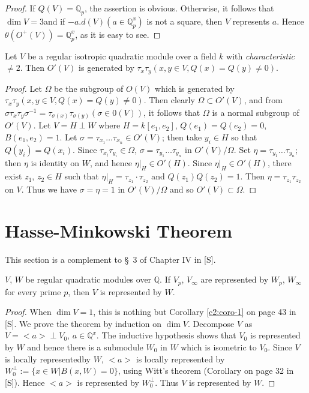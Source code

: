 \begin{proof}
If $Q(V)=\mathbb{Q}_{p}$, the assertion is obvious. Otherwise, it
follows that $\dim V=3$\pageoriginale and if
$-a.d(V)(a\in\mathbb{Q}^{x}_{p})$ is not a square, then $V$ represents
$a$. Hence $\theta(O^{+}(V))=\mathbb{Q}^{x}_{p}$, as it is easy to see.
\end{proof}

\begin{prop}\label{c2:prop-2.21}
Let $V$ be a regular isotropic quadratic module over a field $k$ with
{\em characteristic} $\neq 2$. Then $O'(V)$ is generated by
$\tau_{x}\tau_{y}(x,y\in V, Q(x)=Q(y)\neq 0)$.
\end{prop}

\begin{proof}
Let $\Omega$ be the subgroup of $O(V)$ which is generated by
$\tau_{x}\tau_{y}(x,y\in V, Q(x)=Q(y)\neq 0)$. Then clearly
$\Omega\subset O'(V)$, and from
$\sigma\tau_{x}\tau_{y}\sigma^{-1}=\tau_{\sigma(x)}\tau_{\sigma(y)}(\sigma\in
0(V))$, it follows that $\Omega$ is a normal subgroup of $O'(V)$. Let
$V=H\perp W$ where $H=k[e_{1},e_{2}]$, $Q(e_{1})=Q(e_{2})=0$,
$B(e_{1},e_{2})=1$. Let $\sigma=\tau_{x_{1}}\ldots \tau_{x_{n}}\in
O'(V)$; then take $y_{i}\in H$ so that $Q(y_{i})=Q(x_{i})$. Since
$\tau_{x_{i}}\tau_{y_{i}}\in\Omega$, $\sigma=\tau_{y_{1}}\ldots
\tau_{y_{n}}$ in $O'(V)/\Omega$. Set $\eta=\tau_{y_{1}}\ldots
\tau_{y_{n}}$; then $\eta$ is identity on $W$, and hence $\eta|_{H}\in
O'(H)$. Since $\eta|_{H}\in O'(H)$, there exist $z_{1}$, $z_{2}\in H$
such that $\eta|_{H}=\tau_{z_{1}}\cdot \tau_{z_{2}}$ and
$Q(z_{1})Q(z_{2})=1$. Then $\eta=\tau_{z_{1}}\tau_{z_{2}}$ on
$V$. Thus we have $\sigma=\eta=1$ in $O'(V)/\Omega$ and so
$O'(V)\subset\Omega$. 
\end{proof}

\section{Hasse-Minkowski Theorem}\label{c2:sec-2.3}

This section is a complement to \S\ 3 of Chapter IV in [S].

\setcounter{theorem}{21}
\begin{theorem}\label{c2:thm-2.22}
$V$, $W$ be regular quadratic modules over $\mathbb{Q}$. If $V_{p}$,
  $V_{\infty}$ are represented by $W_{p}$, $W_{\infty}$ for every
  prime $p$, then $V$ is represented by $W$.
\end{theorem}

\begin{proof}
When $\dim V=1$, this is nothing but Corollary \ref{c2:coro-1} on page 43 in
[S]. We prove the theorem by induction on $\dim V$. Decompose $V$ as
$V=<a>\perp V_{0}$, $a\in \mathbb{Q}^{x}$. The inductive hypothesis
shows that $V_{0}$ is represented by $W$ and hence there is a
submodule $W_{0}$ in $W$ which is isometric to $V_{0}$. Since $V$ is
locally represented\pageoriginale by $W$, $<a>$ is locally represented
by $W^{\perp}_{0}:=\{x\in W|B(x,W)=0\}$, using Witt's theorem
(Corollary on page 32 in [S]). Hence $<a>$ is represented by
$W^{\perp}_{0}$. Thus $V$ is represented by $W$.
\end{proof}


